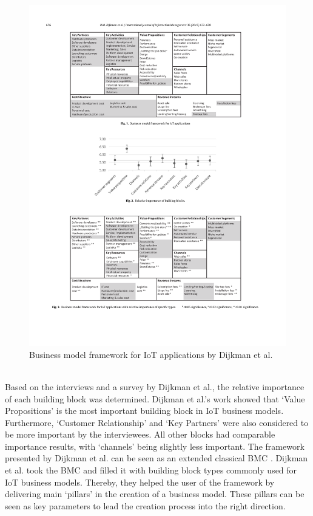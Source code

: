 		\begin{figure}[!htb]
			\begin{center}
		    \includegraphics[scale=1.1]{Talk11/iot_canvas_dijkman.pdf}
		    \end{center}
		    \caption{Business model framework for IoT applications by Dijkman et al. \cite{dijkman}}
		    \label{fig:bm_dijkman}
		\end{figure}
		\\
		Based on the interviews and a survey by Dijkman et al., the relative importance of each building block was determined. Dijkman et al.'s work showed that `Value Propositions' is the most important building block in IoT business models. Furthermore, `Customer Relationship' and `Key Partners' were also considered to be more important by the interviewees. All other blocks had comparable importance results, with `channels' being slightly less important. The framework presented by Dijkman et al. can be seen as an extended classical BMC \cite{bmc}. Dijkman et al. took the BMC and filled it with building block types commonly used for IoT business models. Thereby, they helped the user of the framework by delivering main `pillars' in the creation of a business model. These pillars can be seen as key parameters to lead the creation process into the right direction. 
	\vspace{-2em}
